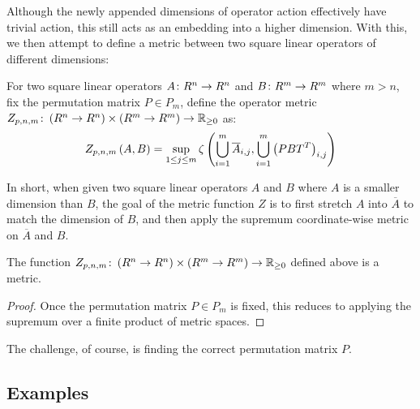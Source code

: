 \documentclass[12pt]{article}
\begin{document}
Although the newly appended dimensions of operator action
effectively have trivial action, this still acts as an embedding into
a higher dimension.
With this, we then attempt to define a metric between
two square linear operators of different dimensions:
\begin{definition}
  For two square linear operators
  \(A \colon R^n \to R^n\) and \(B \colon R^m \to R^m\) where \(m > n\),
  fix the permutation matrix \(P \in P_m\),
  define the operator metric
  \(Z_{p, n, m} \colon \left(R^n \to R^n\right) \times \left(R^m \to R^m\right) \to \mathbb{R}_{\geq 0}\) as:
  \begin{align*}
    Z_{p, n, m}\left(A, B\right) =
      \sup_{1 \leq j \leq m}
        \zeta\left(\bigcup_{i = 1}^{m} \overline{A}_{i, j},
                     \bigcup_{i = 1}^{m} \left(PB{T}^{T}\right)_{i, j}\right)
  \end{align*}
\end{definition}
In short, when given two square linear operators
\(A\) and \(B\) where \(A\)
is a smaller dimension than \(B\), the goal of the metric function \(Z\)
is to first stretch \(A\) into \(\overline{A}\)
to match the dimension of \(B\),
and then apply the supremum coordinate-wise metric
on \(\overline{A}\) and \(B\).

\begin{theorem}
  The function
  \(Z_{p, n, m} \colon \left(R^n \to R^n\right) \times \left(R^m \to R^m\right) \to \mathbb{R}_{\geq 0}\) 
  defined above is a metric.
\end{theorem}
\begin{proof}
  Once the permutation matrix \(P \in P_m\) is fixed, this reduces to
  applying the supremum over a finite product of metric spaces.
\end{proof}

The challenge, of course, is finding the correct permutation matrix \(P\).


\subsection{Examples}






\pagebreak

\printbibliography
\end{document}
